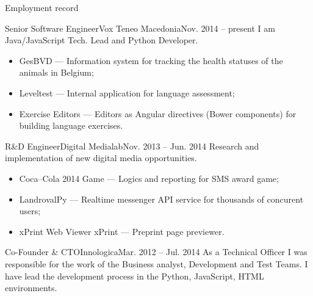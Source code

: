 \documentclass[]{mcdowellcv}
\begin{document}
	\makeheader

	\begin{cvsection}{Employment record}
		\begin{cvsubsection}{Senior Software Engineer}{Vox Teneo Macedonia}{Nov. 2014 -- present}
			I am Java/JavaScript Tech. Lead and Python Developer.
			\begin{itemize}
				\item GesBVD --- Information system for tracking the health statuses of the animals in Belgium;
				\item Leveltest --- Internal application for language assessment;
				\item Exercise Editors --- Editors as Angular directives (Bower components) for building language exercises.
			\end{itemize}
		\end{cvsubsection}

		\begin{cvsubsection}{R\&D Engineer}{Digital Medialab}{Nov. 2013 -- Jun. 2014}
            Research and implementation of new digital media opportunities.
			\begin{itemize}
				\item Coca--Cola 2014 Game --- Logics and reporting for SMS award game;
				\item LandrovalPy --- Realtime messenger API service for thousands of concurent users;
				\item xPrint Web Viewer {xPrint} --- Preprint page previewer.
			\end{itemize}
		\end{cvsubsection}

		\begin{cvsubsection}{Co-Founder \& CTO}{Innologica}{Mar. 2012 -- Jul. 2014}
            As a Technical Officer I was responsible for the work of the Business analyst, Development and Test Teams.\linebreak
            I have lead the development process in the Python, JavaScript, HTML environments.
		\end{cvsubsection}


\end{cvsection}
\end{document}
